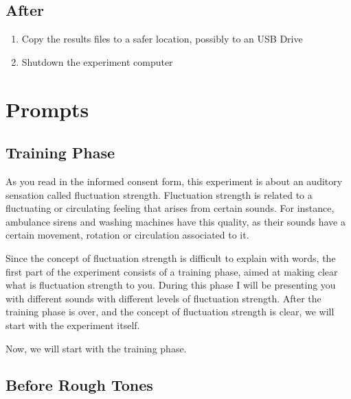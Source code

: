 \documentclass[a4paper]{article}
\begin{document}

\subsection{After} %
\label{sub:after}

\begin{enumerate}
  \item Copy the results files to a safer location, possibly to an USB Drive
  \item Shutdown the experiment computer
\end{enumerate}



\clearpage

\appendix

\section{Prompts} %
\label{sec:prompts}

\subsection{Training Phase} %

As you read in the informed consent form, this experiment is about an auditory
sensation called fluctuation strength. Fluctuation strength is related to a
fluctuating or circulating feeling that arises from certain sounds. For
instance, ambulance sirens and washing machines have this quality, as their
sounds have a certain movement, rotation or circulation associated to it.

Since the concept of fluctuation strength is difficult to explain with words,
the first part of the experiment consists of a training phase, aimed at making
clear what is fluctuation strength to you. During this phase I will be
presenting you with different sounds with different levels of fluctuation
strength. After the training phase is over, and the concept of fluctuation
strength is clear, we will start with the experiment itself.

Now, we will start with the training phase.

\label{sub:training_phase}


\subsection{Before Rough Tones} %
\label{sub:before_rough_tones}
\end{document}
